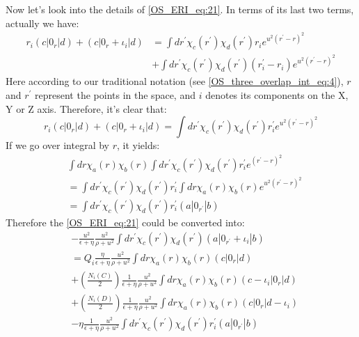 Now let's look into the details of \ref{OS_ERI_eq:21}. In terms of its last
two terms, actually we have:
\begin{equation}
 \begin{split}
 r_{i}(c|0_{r}|d) +(c|0_{r}+\iota_{i}|d) 
&=
\int dr^{'} \chi_{c}(r^{'})\chi_{d}(r^{'})
r_{i}e^{u^{2}(r^{'}-r)^{2}} \\
&+ 
\int dr^{'} \chi_{c}(r^{'})\chi_{d}(r^{'})
(r^{'}_{i}-r_{i})e^{u^{2}(r^{'}-r)^{2}}
 \end{split}
\label{OS_ERI_eq:22}
\end{equation}
Here according to our traditional notation (see \ref{OS_three_overlap_int_eq:4}),
$r$ and $r^{'}$ represent the points in the space, and $i$ denotes its components
on the X, Y or Z axis. Therefore, it's clear that:
\begin{equation}
  r_{i}(c|0_{r}|d) +(c|0_{r}+\iota_{i}|d) =
\int dr^{'} \chi_{c}(r^{'})\chi_{d}(r^{'})
r^{'}_{i}e^{u^{2}(r^{'}-r)^{2}}
\label{OS_ERI_eq:23}
\end{equation}  
If we go over integral by $r$, it yields:
\begin{equation}
\begin{split}
&\int dr \chi_{a}(r)\chi_{b}(r) \int dr^{'} \chi_{c}(r^{'})\chi_{d}(r^{'})
r^{'}_{i}e^{(r^{'}-r)^{2}} \\
&= \int dr^{'} \chi_{c}(r^{'})\chi_{d}(r^{'}) r^{'}_{i}
\int dr \chi_{a}(r)\chi_{b}(r) e^{u^{2}(r^{'}-r)^{2}} \\
&= \int dr^{'} \chi_{c}(r^{'})\chi_{d}(r^{'}) r^{'}_{i}(a|0_{r^{'}}|b)
\end{split}
\label{OS_ERI_eq:24}
\end{equation}
Therefore the \ref{OS_ERI_eq:21} could be converted into:
\begin{equation}
 \begin{split}
  &-\frac{u^{2}}{\epsilon+\eta}\frac{u^{2}}
{\rho+u^{2}}\int dr^{'} \chi_{c}(r^{'})\chi_{d}(r^{'})(a|0_{r^{'}}+\iota_{i}|b) \\
&=Q_{i}\frac{\eta}{\epsilon+\eta}\frac{u^{2}}
{\rho+u^{2}}\int dr \chi_{a}(r)\chi_{b}(r)(c|0_{r}|d) \\
&+
\left(\frac{N_{i}(C)}{2}\right)\frac{1}{\epsilon+\eta}\frac{u^{2}}
{\rho+u^{2}}\int dr \chi_{a}(r)\chi_{b}(r)(c-\iota_{i}|0_{r}|d) \\
&+
\left(\frac{N_{i}(D)}{2}\right)\frac{1}{\epsilon+\eta}\frac{u^{2}}
{\rho+u^{2}}\int dr \chi_{a}(r)\chi_{b}(r)(c|0_{r}|d-\iota_{i}) \\
&-\eta \frac{1}{\epsilon+\eta}\frac{u^{2}}
{\rho+u^{2}}\int dr^{'} \chi_{c}(r^{'})\chi_{d}(r^{'}) r^{'}_{i}(a|0_{r^{'}}|b)
 \end{split}
\label{OS_ERI_eq:25}
\end{equation}

